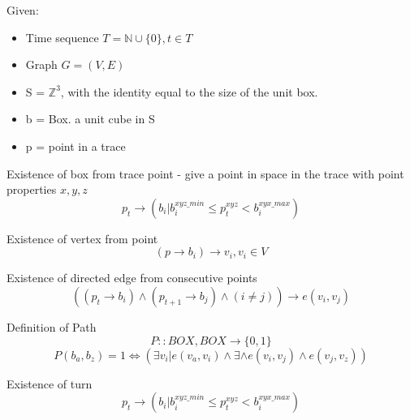 \documentclass{article}
\newcommand\N{\mathbb{N}}
\begin{document}
Given:\\
\begin{itemize}
    \setlength\itemsep{0.2em}
\item Time sequence $T =  \N \cup \{0\}, t \in T$\\
\item Graph $G = (V,E)$
\item S = $\mathbb{Z}^3$, with the identity equal to the size of the unit box.
\item b = Box.  a unit cube in S 
\item p = point in a trace 
\end{itemize}


Existence of box from trace point - give a point in space in the trace with point properties $x,y,z$ 
$$p_t \rightarrow (b_i | b_i^{xyz\_min} \leq p_t^{xyz} < b_i^{xyx\_max})$$

Existence of vertex from point
$$(p \rightarrow b_i) \rightarrow v_i, v_i \in V$$

Existence of directed edge from consecutive points
$$((p_t \rightarrow b_i) \land (p_{t+1} \rightarrow b_j) \land (i \neq j)) \rightarrow e(v_i, v_j) $$

Definition of Path
$$P ::  BOX, BOX \rightarrow \{0,1\}$$
$$P(b_a, b_z) = 1 \Leftrightarrow (\exists v_i | e(v_a, v_i) \land \exists \land e(v_i, v_j) \land e(v_j, v_z)) $$

Existence of turn
$$p_t \rightarrow (b_i | b_i^{xyz\_min} \leq p_t^{xyz} < b_i^{xyx\_max})$$
\end{document}
